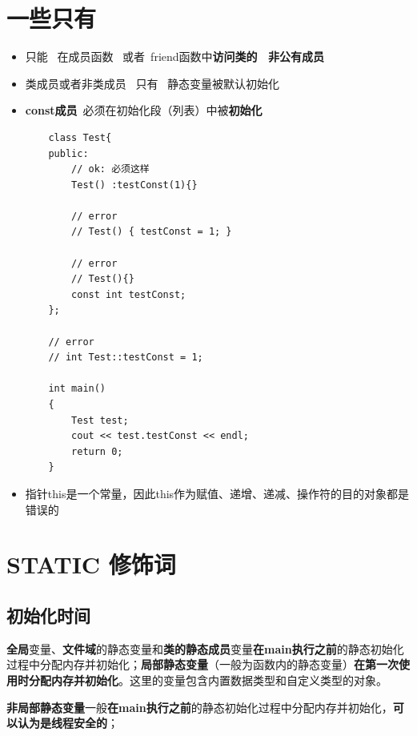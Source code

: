 \documentclass[UTF8,a4paper,12pt]{ctexbook} %
\begin{document}
\section{一些只有}
	       \begin{itemize}
		       \item 只能 \ 在成员函数 \ 或者\ friend函数中\textbf{访问类的 \ 非公有成员}
		       
		       \item 类成员或者非类成员  \   只有  \   静态变量被默认初始化
		       
		       \item \textbf{const成员}\ 必须在初始化段（列表）中被\textbf{初始化}
\begin{lstlisting}
	class Test{
	public:
		// ok: 必须这样
		Test() :testConst(1){}
		
		// error
		// Test() { testConst = 1; }
		
		// error
		// Test(){}
		const int testConst;
	};
	
	// error
	// int Test::testConst = 1;
	
	int main()
	{
		Test test;
		cout << test.testConst << endl;
		return 0;
	}
\end{lstlisting}

		       \item 指针this是一个常量，因此this作为赋值、递增、递减、操作符的目的对象都是错误的
		    \end{itemize}
	       
\section{STATIC 修饰词}
	\subsection{初始化时间}
		\textbf{全局}变量、\textbf{文件域}的静态变量和\textbf{类的静态成员}变量\textbf{在main执行之前}的静态初始化过程中分配内存并初始化；\textbf{局部静态变量}（一般为函数内的静态变量）\textbf{在第一次使用时分配内存并初始化}。这里的变量包含内置数据类型和自定义类型的对象。  
		
		 
		 \textbf{非局部静态变量}一般\textbf{在main执行之前}的静态初始化过程中分配内存并初始化，\textbf{可以认为是线程安全的}； 
\end{document}
